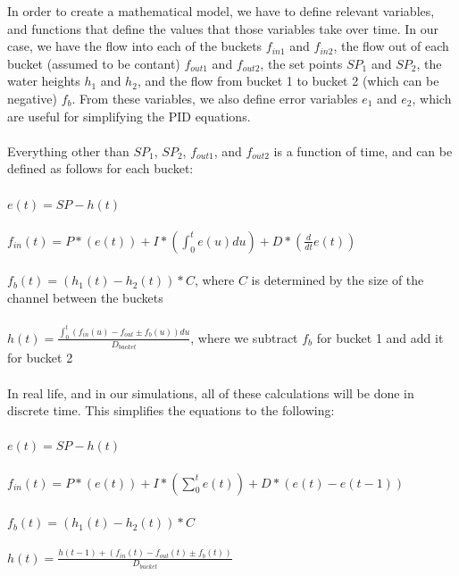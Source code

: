 \documentclass[11pt]{article}
\begin{document}
In order to create a mathematical model, we have to define relevant variables, and functions that define the values that those variables take over time.
In our case, we have the flow into each of the buckets $f_{in1}$ and $f_{in2}$, the flow out of each bucket (assumed to be contant) $f_{out1}$ and $f_{out2}$, the set points $SP_1$ and $SP_2$, the water heights $h_1$ and $h_2$, and the flow from bucket 1 to bucket 2 (which can be negative) $f_b$.
From these variables, we also define error variables $e_1$ and $e_2$, which are useful for simplifying the PID equations.\\ \\
Everything other than $SP_1$, $SP_2$, $f_{out1}$, and $f_{out2}$ is a function of time, and can be defined as follows for each bucket:\\
\\
$e(t) = SP - h(t)$\\ \\
$f_{in}(t) = P*(e(t)) + I*(\int_0^t e(u) du) + D*(\frac{d}{dt}e(t))$ \\ \\
$f_b(t) = (h_1(t)-h_2(t))*C$, where $C$ is determined by the size of the channel between the buckets \\ \\
$h(t) = \frac{\int_0^t (f_{in}(u)-f_{out} \pm f_b(u)) du}{D_{bucket}}$, where we subtract $f_b$ for bucket 1 and add it for bucket 2 \\ \\
In real life, and in our simulations, all of these calculations will be done in discrete time. This simplifies the equations to the following: \\ \\
$e(t) = SP - h(t)$ \\ \\
$f_{in}(t) = P*(e(t)) + I*(\sum_0^t e(t)) + D*(e(t)-e(t-1))$ \\ \\
$f_b(t) = (h_1(t)-h_2(t))*C$\\ \\
$h(t) = \frac{h(t-1)+(f_{in}(t) - f_{out}(t) \pm f_b(t))}{D_{bucket}}$\\ \\
\end{document}

